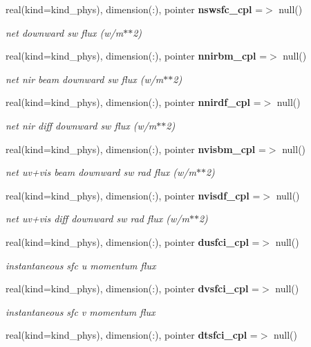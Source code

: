 \begin{DoxyCompactItemize}
real(kind=kind\+\_\+phys), dimension(\+:), pointer \textbf{ nswsfc\+\_\+cpl} =$>$ null()
\begin{DoxyCompactList}\small\item\em net downward sw flux (w/m$\ast$$\ast$2) \end{DoxyCompactList}\item 
real(kind=kind\+\_\+phys), dimension(\+:), pointer \textbf{ nnirbm\+\_\+cpl} =$>$ null()
\begin{DoxyCompactList}\small\item\em net nir beam downward sw flux (w/m$\ast$$\ast$2) \end{DoxyCompactList}\item 
real(kind=kind\+\_\+phys), dimension(\+:), pointer \textbf{ nnirdf\+\_\+cpl} =$>$ null()
\begin{DoxyCompactList}\small\item\em net nir diff downward sw flux (w/m$\ast$$\ast$2) \end{DoxyCompactList}\item 
real(kind=kind\+\_\+phys), dimension(\+:), pointer \textbf{ nvisbm\+\_\+cpl} =$>$ null()
\begin{DoxyCompactList}\small\item\em net uv+vis beam downward sw rad flux (w/m$\ast$$\ast$2) \end{DoxyCompactList}\item 
real(kind=kind\+\_\+phys), dimension(\+:), pointer \textbf{ nvisdf\+\_\+cpl} =$>$ null()
\begin{DoxyCompactList}\small\item\em net uv+vis diff downward sw rad flux (w/m$\ast$$\ast$2) \end{DoxyCompactList}\item 
real(kind=kind\+\_\+phys), dimension(\+:), pointer \textbf{ dusfci\+\_\+cpl} =$>$ null()
\begin{DoxyCompactList}\small\item\em instantaneous sfc u momentum flux \end{DoxyCompactList}\item 
real(kind=kind\+\_\+phys), dimension(\+:), pointer \textbf{ dvsfci\+\_\+cpl} =$>$ null()
\begin{DoxyCompactList}\small\item\em instantaneous sfc v momentum flux \end{DoxyCompactList}\item 
real(kind=kind\+\_\+phys), dimension(\+:), pointer \textbf{ dtsfci\+\_\+cpl} =$>$ null()

\end{DoxyCompactItemize}

